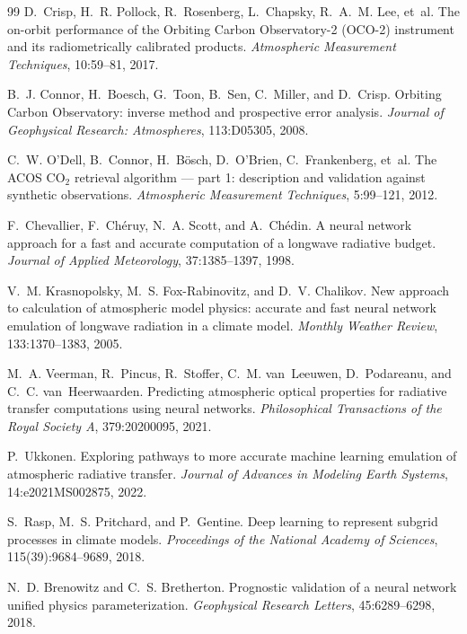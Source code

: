 \begin{thebibliography}{99}
D.~Crisp, H.~R. Pollock, R.~Rosenberg, L.~Chapsky, R.~A.~M. Lee, et~al.
\newblock The on-orbit performance of the {Orbiting Carbon Observatory-2} ({OCO-2}) instrument and
its radiometrically calibrated products.
\newblock \emph{Atmospheric Measurement Techniques}, 10:59--81, 2017.

B.~J. Connor, H.~Boesch, G.~Toon, B.~Sen, C.~Miller, and D.~Crisp.
\newblock Orbiting {Carbon} {Observatory}: inverse method and prospective error analysis.
\newblock \emph{Journal of Geophysical Research: Atmospheres}, 113:D05305, 2008.

C.~W. O'Dell, B.~Connor, H.~B{\"o}sch, D.~O'Brien, C.~Frankenberg, et~al.
\newblock The {ACOS} {CO$_2$} retrieval algorithm --- part 1: description and validation
against synthetic observations.
\newblock \emph{Atmospheric Measurement Techniques}, 5:99--121, 2012.

F.~Chevallier, F.~Ch\'eruy, N.~A. Scott, and A.~Ch\'edin.
\newblock A neural network approach for a fast and accurate computation of a longwave
radiative budget.
\newblock \emph{Journal of Applied Meteorology}, 37:1385--1397, 1998.

V.~M. Krasnopolsky, M.~S. Fox-Rabinovitz, and D.~V. Chalikov.
\newblock New approach to calculation of atmospheric model physics: accurate and fast neural
network emulation of longwave radiation in a climate model.
\newblock \emph{Monthly Weather Review}, 133:1370--1383, 2005.

M.~A. Veerman, R.~Pincus, R.~Stoffer, C.~M. van~Leeuwen, D.~Podareanu, and
C.~C. van~Heerwaarden.
\newblock Predicting atmospheric optical properties for radiative transfer computations using
neural networks.
\newblock \emph{Philosophical Transactions of the Royal Society A}, 379:20200095, 2021.

P.~Ukkonen.
\newblock Exploring pathways to more accurate machine learning emulation of atmospheric
radiative transfer.
\newblock \emph{Journal of Advances in Modeling Earth Systems}, 14:e2021MS002875, 2022.

S.~Rasp, M.~S. Pritchard, and P.~Gentine.
\newblock Deep learning to represent subgrid processes in climate models.
\newblock \emph{Proceedings of the National Academy of Sciences}, 115(39):9684--9689, 2018.

N.~D. Brenowitz and C.~S. Bretherton.
\newblock Prognostic validation of a neural network unified physics parameterization.
\newblock \emph{Geophysical Research Letters}, 45:6289--6298, 2018.


\end{thebibliography}
